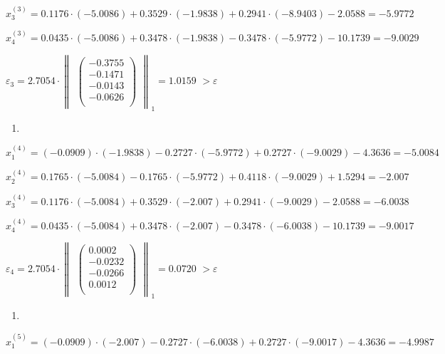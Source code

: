 \documentclass[10pt, a4paper]{scrartcl}
\begin{document}
\(\displaystyle x_3^{(3)} = 0.1176\cdot(-5.0086) + 0.3529\cdot(-1.9838) + 0.2941\cdot(-8.9403) - 2.0588= -5.9772\)

\(\displaystyle x_4^{(3)} = 0.0435\cdot(-5.0086) + 0.3478\cdot(-1.9838) - 0.3478\cdot(-5.9772) - 10.1739 = -9.0029\)

\(\displaystyle \varepsilon_3 = 2.7054 \cdot \begin{Vmatrix}\begin{pmatrix} -0.3755\\ -0.1471\\ -0.0143\\ -0.0626\\ \end{pmatrix}\end{Vmatrix} _1 = \mathbf{1.0159}\)
\(\displaystyle > \varepsilon\)

\begin{enumerate}
\def\labelenumi{\arabic{enumi})}
\setcounter{enumi}{3}
\item
\end{enumerate}

\(\displaystyle x_1^{(4)} = (-0.0909)\cdot(-1.9838) - 0.2727\cdot(-5.9772) + 0.2727\cdot(-9.0029) - 4.3636 = -5.0084\)

\(\displaystyle x_2^{(4)} = 0.1765\cdot(-5.0084) - 0.1765\cdot(-5.9772) + 0.4118\cdot(-9.0029) + 1.5294 = -2.007\)

\(\displaystyle x_3^{(4)} = 0.1176\cdot(-5.0084) + 0.3529\cdot(-2.007) + 0.2941\cdot(-9.0029) - 2.0588= -6.0038\)

\(\displaystyle x_4^{(4)} = 0.0435\cdot(-5.0084) + 0.3478\cdot(-2.007) - 0.3478\cdot(-6.0038) - 10.1739 = -9.0017\)

\(\displaystyle \varepsilon_4 = 2.7054 \cdot \begin{Vmatrix}\begin{pmatrix} 0.0002\\ -0.0232\\ -0.0266\\ 0.0012\\ \end{pmatrix}\end{Vmatrix} _1 = \mathbf{0.0720}\)
\(\displaystyle > \varepsilon\)

\begin{enumerate}
\def\labelenumi{\arabic{enumi})}
\setcounter{enumi}{4}
\item
\end{enumerate}

\(\displaystyle x_1^{(5)} = (-0.0909)\cdot(-2.007) - 0.2727\cdot(-6.0038) + 0.2727\cdot(-9.0017) - 4.3636 = -4.9987\)
\end{document}
